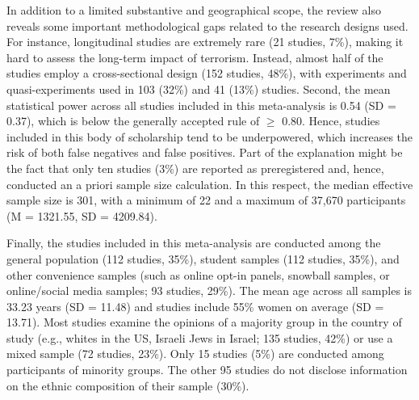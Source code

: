 In addition to a limited substantive and geographical scope, the review also reveals some important methodological gaps related to the research designs used. For instance, longitudinal studies are extremely rare (21 studies, 7\%), making it hard to assess the long-term impact of terrorism. Instead, almost half of the studies employ a cross-sectional design (152 studies, 48\%), with experiments and quasi-experiments used in 103 (32\%) and 41 (13\%) studies. Second, the mean statistical power across all studies included in this meta-analysis is 0.54 (SD = 0.37), which is below the generally accepted rule of $\geq$ 0.80. Hence, studies included in this body of scholarship tend to be underpowered, which increases the risk of both false negatives and false positives. Part of the explanation might be the fact that only ten studies (3\%) are reported as preregistered and, hence, conducted an a priori sample size calculation. In this respect, the median effective sample size is 301, with a minimum of 22 and a maximum of 37,670 participants (M = 1321.55, SD = 4209.84). 

Finally, the studies included in this meta-analysis are conducted among the general population (112 studies, 35\%), student samples (112 studies, 35\%), and other convenience samples (such as online opt-in panels, snowball samples, or online/social media samples; 93 studies, 29\%). The mean age across all samples is 33.23 years (SD = 11.48) and studies include 55\% women on average (SD = 13.71). Most studies examine the opinions of a majority group in the country of study (e.g., whites in the US, Israeli Jews in Israel; 135 studies, 42\%) or use a mixed sample (72 studies, 23\%). Only 15 studies (5\%) are conducted among participants of minority groups. The other 95 studies do not disclose information on the ethnic composition of their sample (30\%).


